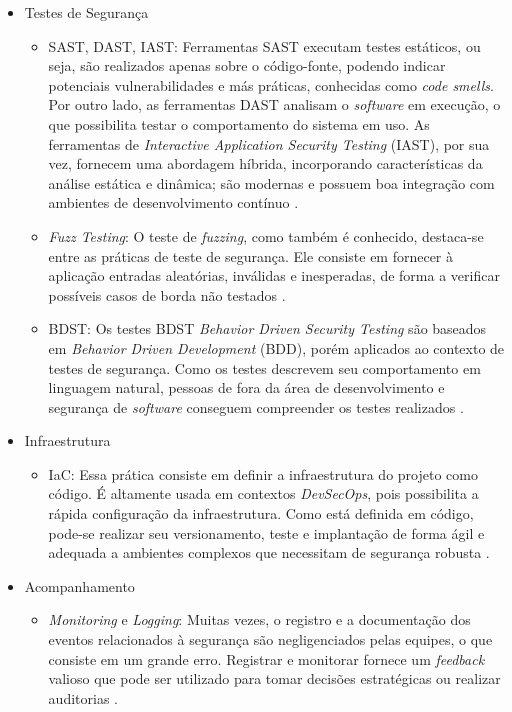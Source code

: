 \begin{itemize}
\begin{itemize}
    \end{itemize}
    \item Testes de Segurança
    \begin{itemize}
        \item SAST, DAST, IAST: Ferramentas SAST executam testes estáticos, ou seja, são realizados apenas sobre o código-fonte, podendo indicar potenciais vulnerabilidades e más práticas, conhecidas como \textit{code smells}. Por outro lado, as ferramentas DAST analisam o \textit{software} em execução, o que possibilita testar o comportamento do sistema em uso. As ferramentas de \textit{Interactive Application Security Testing} (IAST), por sua vez, fornecem uma abordagem híbrida, incorporando características da análise estática e dinâmica; são modernas e possuem boa integração com ambientes de desenvolvimento contínuo \cite{Rajapakse2022}. 
        \item \textit{Fuzz Testing}: O teste de \textit{fuzzing}, como também é conhecido, destaca-se entre as práticas de teste de segurança. Ele consiste em fornecer à aplicação entradas aleatórias, inválidas e inesperadas, de forma a verificar possíveis casos de borda não testados \cite{Masood2015}.
        \item BDST: Os testes BDST \textit{Behavior Driven Security Testing} são baseados em \textit{Behavior Driven Development} (BDD), porém aplicados ao contexto de testes de segurança. Como os testes descrevem seu comportamento em linguagem natural, pessoas de fora da área de desenvolvimento e segurança de \textit{software} conseguem compreender os testes realizados \cite{Rangnau2020145}.
    \end{itemize}
    \item Infraestrutura
    \begin{itemize}
        \item IaC: Essa prática consiste em definir a infraestrutura do projeto como código. É altamente usada em contextos \textit{DevSecOps}, pois possibilita a rápida configuração da infraestrutura. Como está definida em código, pode-se realizar seu versionamento, teste e implantação de forma ágil e adequada a ambientes complexos que necessitam de segurança robusta \cite{Rajapakse2022}.
    \end{itemize}
    \item Acompanhamento
    \begin{itemize}
        \item \textit{Monitoring} e \textit{Logging}: Muitas vezes, o registro e a documentação dos eventos relacionados à segurança são negligenciados pelas equipes, o que consiste em um grande erro. Registrar e monitorar fornece um \textit{feedback} valioso que pode ser utilizado para tomar decisões estratégicas ou realizar auditorias \cite{Rajapakse2022}.
    \end{itemize}
\end{itemize}



